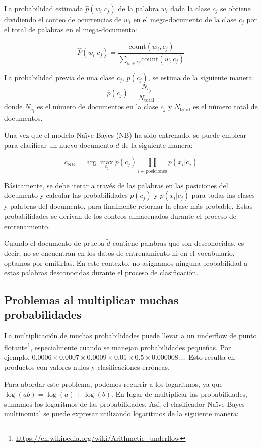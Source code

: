 \documentclass[11pt,fleqn]{book} %
\begin{document}
La probabilidad estimada $\hat{p}(w_i | c_j)$ de la palabra $w_i$ dada la clase $c_j$ se obtiene dividiendo el conteo de ocurrencias de $w_i$ en el mega-documento de la clase $c_j$ por el total de palabras en el mega-documento:

\[
\hat{P}(w_i | c_j) = \frac{{\text{count}(w_i, c_j)}}{\sum_{w\in V}{\text{count}(w, c_j)}}
\]


La probabilidad previa de una clase $c_j$, $p(c_j)$, se estima de la siguiente manera:
    \[
    \hat{p}(c_j) = \frac{N_{c_j}}{N_{\text{total}}}
    \]
donde $N_{c_j}$ es el número de documentos en la clase $c_j$ y $N_{\text{total}}$ es el número total de documentos.


Una vez que el modelo Naïve Bayes (NB) ha sido entrenado, se puede emplear para clasificar un nuevo documento $\tilde{d}$ de la siguiente manera:

\[
c_{\text{NB}} = \arg\max_{c_j} p(c_j) \prod_{i \in \text{posiciones}} p(x_i | c_j)
\]

Básicamente, se debe iterar a través de las palabras en las posiciones del documento y calcular las probabilidades $p(c_j)$ y $p(x_i | c_j)$ para todas las clases y palabras del documento, para finalmente retornar la clase más probable. Estas probabilidades se derivan de los conteos almacenados durante el proceso de entrenamiento.

Cuando el documento de prueba $\tilde{d}$ contiene palabras que son desconocidas, es decir, no se encuentran en los datos de entrenamiento ni en el vocabulario, optamos por omitirlas. En este contexto, no asignamos ninguna probabilidad a estas palabras desconocidas durante el proceso de clasificación.

\subsection{Problemas al multiplicar muchas probabilidades}

La multiplicación de muchas probabilidades puede llevar a un underflow de punto flotante\footnote{\url{https://en.wikipedia.org/wiki/Arithmetic_underflow}}, especialmente cuando se manejan probabilidades pequeñas. Por ejemplo, $0.0006 \times 0.0007 \times 0.0009 \times 0.01 \times 0.5 \times 0.000008 \ldots$. Esto resulta en productos con valores nulos y clasificaciones erróneas.

Para abordar este problema, podemos recurrir a los logaritmos, ya que $\log(ab) = \log(a) + \log(b)$. En lugar de multiplicar las probabilidades, sumamos los logaritmos de las probabilidades. Así, el clasificador Naïve Bayes multinomial se puede expresar utilizando logaritmos de la siguiente manera:
\end{document}
